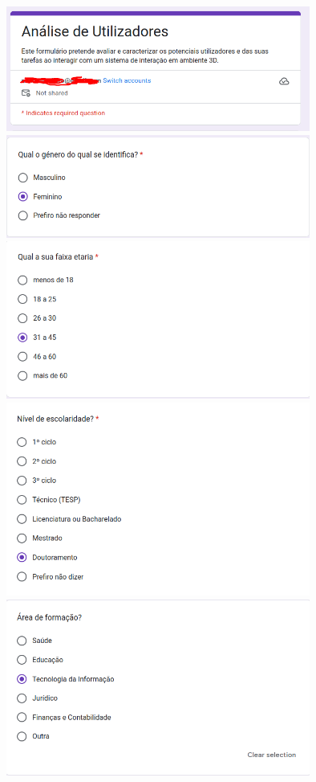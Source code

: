 \documentclass[a4paper,12pt]{article}
\begin{document}
\begin{center}
    \vspace{0.3cm}
    \includegraphics[width=0.75\textwidth]{form/intro_form.png}
    \includegraphics[width=0.75\textwidth]{form/01questao_genero.png}
    \includegraphics[width=0.75\textwidth]{form/02questao_idade.png}
    \includegraphics[width=0.75\textwidth]{form/03questao_escolaridade.png}
    \includegraphics[width=0.75\textwidth]{form/04questao_formacao.png}

\end{center}
\end{document}
